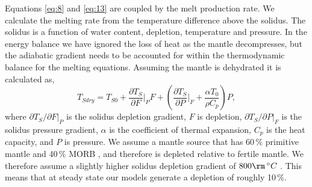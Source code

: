 \documentclass[draft,grl]{agutexSI2018}
\begin{document}
\begin{article}
Equations \ref{eq:8} and \ref{eq:13} are coupled by the melt production rate. We calculate the melting rate from the temperature difference above the solidus. The solidus is a function of water content, depletion, temperature and pressure. In the energy balance we have ignored the loss of heat as the mantle decompresses, but the adiabatic gradient needs to be accounted for within the thermodynamic balance for the melting equations. Assuming the mantle is dehydrated it is calculated as,
\begin{equation}
T_{Sdry} = T_{S0} + \frac{\partial T_{S}}{\partial F}\vert_{P}F + \left(\frac{\partial T_{S}}{\partial P}\vert_{F} + \frac{\alpha T_{0}}{\rho C_{p}}\right)P,
\label{eq:14}
\end{equation}
where $\partial T_{S}/\partial F\vert_{P}$ is the solidus depletion gradient, $F$ is depletion, $\partial T_{S}/\partial P\vert_{F}$ is the solidus pressure gradient, $\alpha$ is the coefficient of thermal expansion, $C_{p}$ is the heat capacity, and $P$ is pressure. We assume a mantle source that has 60\,\% primitive mantle and 40\,\% MORB \citep{shorttle-2011}, and therefore is depleted relative to fertile mantle. We therefore assume a slightly higher solidus depletion gradient of $800\rm\,^{\circ}C$ \citep{wasylenki-etal-2003,armitage-etal-g3-2011}. This means that at steady state our models generate a depletion of roughly 10\,\%.


\end{article}
\end{document}
